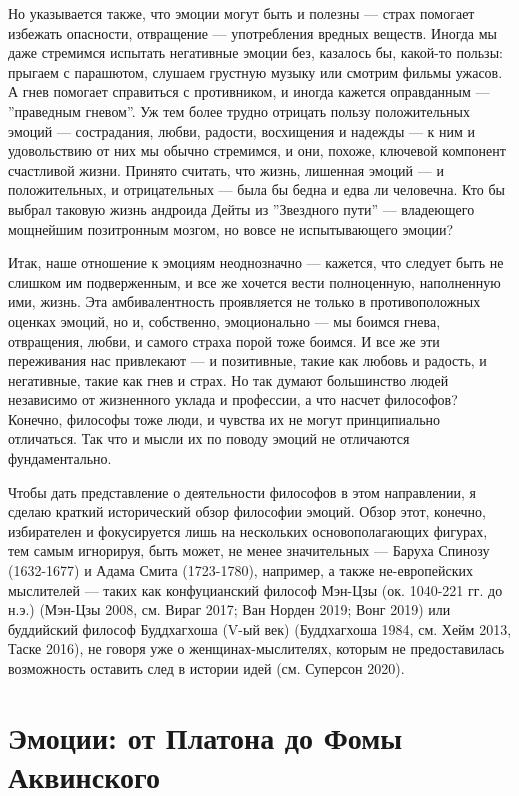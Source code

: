 \documentclass[11pt]{book}
\begin{document}
Но указывается также, что эмоции могут быть и полезны --- страх помогает избежать опасности, отвращение --- употребления вредных веществ. Иногда мы даже стремимся испытать негативные эмоции без, казалось бы, какой-то пользы: прыгаем с парашютом, слушаем грустную музыку или смотрим фильмы ужасов. А гнев помогает справиться с противником, и иногда кажется оправданным --- ''праведным гневом''. Уж тем более трудно отрицать пользу положительных эмоций --- сострадания, любви, радости, восхищения и надежды --- к ним и удовольствию от них мы обычно стремимся, и они, похоже, ключевой компонент счастливой жизни. Принято считать, что жизнь, лишенная эмоций --- и положительных, и отрицательных --- была бы бедна и едва ли человечна. Кто бы выбрал таковую жизнь андроида Дейты из ''Звездного пути'' --- владеющего мощнейшим позитронным мозгом, но вовсе не испытывающего эмоции?

Итак, наше отношение к эмоциям неоднозначно --- кажется, что следует быть не слишком им подверженным, и все же хочется вести полноценную, наполненную ими, жизнь. Эта амбивалентность проявляется не только в противоположных оценках эмоций, но и, собственно, эмоционально --- мы боимся гнева, отвращения, любви, и самого страха порой тоже боимся. И все же эти переживания нас привлекают --- и позитивные, такие как любовь и радость, и негативные, такие как гнев и страх. Но так думают большинство людей независимо от жизненного уклада и профессии, а что насчет философов? Конечно, философы тоже люди, и чувства их не могут принципиально отличаться. Так что и мысли их по поводу эмоций не отличаются фундаментально.

Чтобы дать представление о деятельности философов в этом направлении, я сделаю краткий исторический обзор философии эмоций. Обзор этот, конечно, избирателен и фокусируется лишь на нескольких основополагающих фигурах, тем самым игнорируя, быть может, не менее значительных --- Баруха Спинозу (1632-1677) и Адама Смита (1723-1780), например, а также не-европейских мыслителей --- таких как конфуцианский философ Мэн-Цзы (ок. 1040-221 гг. до н.э.) (Мэн-Цзы 2008, см. Вираг 2017; Ван Норден 2019; Вонг 2019) или буддийский философ Буддхагхоша (V-ый век) (Буддхагхоша 1984, см. Хейм 2013, Таске 2016), не говоря уже о женщинах-мыслителях, которым не предоставилась возможность оставить след в истории идей (см. Суперсон 2020).

\section{Эмоции: от Платона до Фомы Аквинского}
\end{document}
